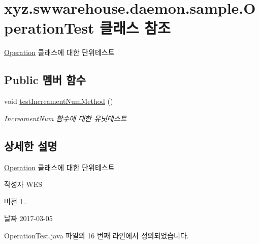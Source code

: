 \hypertarget{classxyz_1_1swwarehouse_1_1daemon_1_1sample_1_1_operation_test}{\section{xyz.\-swwarehouse.\-daemon.\-sample.\-Operation\-Test 클래스 참조}
\label{classxyz_1_1swwarehouse_1_1daemon_1_1sample_1_1_operation_test}
}


\hyperlink{classxyz_1_1swwarehouse_1_1daemon_1_1sample_1_1_operation}{Operation} 클래스에 대한 단위테스트  


\subsection*{Public 멤버 함수}
\begin{DoxyCompactItemize}
\item 
void \hyperlink{classxyz_1_1swwarehouse_1_1daemon_1_1sample_1_1_operation_test_a64e62d430d25bd9177afb82935f0118a}{test\-Increament\-Num\-Method} ()
\begin{DoxyCompactList}\small\item\em Increament\-Num 함수에 대한 유닛테스트 \end{DoxyCompactList}\end{DoxyCompactItemize}


\subsection{상세한 설명}
\hyperlink{classxyz_1_1swwarehouse_1_1daemon_1_1sample_1_1_operation}{Operation} 클래스에 대한 단위테스트 

\begin{DoxyAuthor}{작성자}
W\-E\-S 
\end{DoxyAuthor}
\begin{DoxyVersion}{버전}
1.. 
\end{DoxyVersion}
\begin{DoxyDate}{날짜}
2017-\/03-\/05 
\end{DoxyDate}


Operation\-Test.\-java 파일의 16 번째 라인에서 정의되었습니다.



